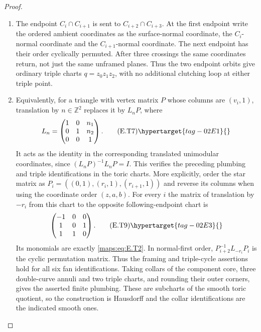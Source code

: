 \begin{proof}
\begin{enumerate}[label={$\langle1\rangle$\arabic*.},leftmargin=*]
\item The endpoint $C_i\cap C_{i+1}$ is sent to
$C_{i+2}\cap C_{i+3}$.  At the first endpoint write the
ordered ambient coordinates as the surface-normal coordinate,
the $C_i$-normal coordinate and the $C_{i+1}$-normal coordinate.
The next endpoint has their order cyclically permuted.
After three crossings the same coordinates return, not just
the same unframed planes.  Thus the two endpoint orbits give
ordinary triple charts $q=z_0z_1z_2$, with no additional
clutching loop at either triple point.

\item Equivalently, for a triangle with vertex matrix $P$ whose
columns are $(v_i,1)$, translation by $n\in\mathbb Z^2$
replaces it by $L_nP$, where
\[
 L_n=\begin{pmatrix}1&0&n_1\\0&1&n_2\\0&0&1\end{pmatrix}.
 \tag{E.T7}\hypertarget{tag-02E1}{}\label{maps:eq:E.T7}
\]
It acts as the identity in the corresponding translated
unimodular coordinates, since
$(L_nP)^{-1}L_nP=I$.  This verifies the preceding plumbing
and triple identifications in the toric charts.
More explicitly, order the star matrix as
$P_i=((0,1),(r_i,1),(r_{i+1},1))$ and reverse its
columns when using the coordinate order $(z,a,b)$.
For every $i$ the matrix of translation by $-r_i$ from
this chart to the opposite following-endpoint chart is
\[
 \begin{pmatrix}-1&0&0\\1&0&1\\1&1&0\end{pmatrix}.
 \tag{E.T9}\hypertarget{tag-02E3}{}\label{maps:eq:E.T9}
\]
Its monomials are exactly \eqref{maps:eq:E.T2}.  In normal-first order,
$P_{i+2}^{-1}L_{-r_i}P_i$ is the cyclic permutation
matrix.  Thus the framing and triple-cycle assertions hold for all six fan identifications.
Taking collars of the component core, three double-curve
annuli and two triple charts, and rounding their outer
corners, gives the asserted finite plumbing.  These are
subcharts of the smooth toric quotient, so the construction
is Hausdorff and the collar identifications are the indicated
smooth ones.


\end{enumerate}
\end{proof}
